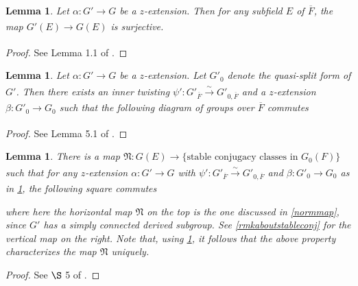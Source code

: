 \documentclass[11pt,a4paper]{article}
\theoremstyle{definition}
\theoremstyle{plain}
\newtheorem{Le}[shared]{Lemma}
\theoremstyle{remark}
\theoremstyle{plain}
\begin{document}
\begin{Le}\label{zextensionlemma0}
    Let $\alpha: G' \xrightarrow[]{} G$ be a $z$-extension. Then for any subfield $E$ of $\overline{F}$, the map $G'(E) \xrightarrow[]{} G(E)$ is surjective.
\end{Le}
\begin{proof}
    See Lemma 1.1 of \cite{MR683003}.
\end{proof}

\begin{Le}\label{zextensionlemma}
    Let $\alpha: G' \xrightarrow[]{} G$ be a $z$-extension. Let $G'_0$ denote the quasi-split form of $G'$. Then there exists an inner twisting $\psi': G'_{\overline{F}} \xrightarrow[]{\sim} G'_{0,\overline{F}}$ and a $z$-extension $\beta: G'_0 \xrightarrow[]{} G_0$ such that the following diagram of groups over $\overline{F}$ commutes
    \begin{center}
    \end{center}    
\end{Le}
\begin{proof}
    See Lemma 5.1 of \cite{MR683003}.
\end{proof}

\begin{Le}\label{normmapdef2}
    There is a map $\mathfrak{N}: G(E) \xrightarrow[]{} \{ \text{stable conjugacy classes in } G_0(F) \}$ such that for any $z$-extension $\alpha: G' \xrightarrow[]{} G$ with $\psi': G'_{\overline{F}} \xrightarrow{\sim} G'_{0,\overline{F}}$ and $\beta: G'_0 \xrightarrow[]{} G_0$ as in \ref{zextensionlemma}, the following square commutes
    \begin{center}
    \end{center}
    where here the horizontal map $\mathfrak{N}$ on the top is the one discussed in \ref{normmap}, since $G'$ has a simply connected derived subgroup. See \ref{rmkaboutstableconj} for the vertical map on the right. Note that, using \ref{zextensionlemma0}, it follows that the above property characterizes the map $\mathfrak{N}$ uniquely.
\end{Le}
\begin{proof}
    See $\S$ 5 of \cite{MR683003}.
\end{proof}
\end{document}
